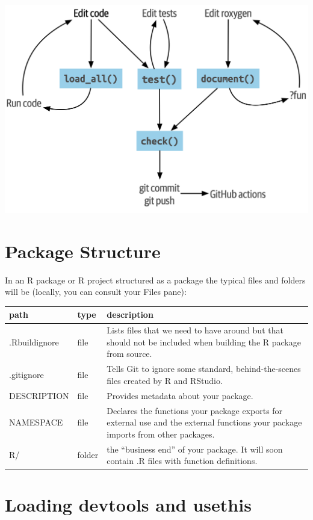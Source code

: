 \documentclass[
]{book}
\begin{document}
\includegraphics[width=19.61in]{images/package_workflow}

\hypertarget{package-structure}{%
\section{Package Structure}\label{package-structure}}

In an R package or R project structured as a package the typical files and folders will be (locally, you can consult your Files pane):

\begin{tabular}{l|l|l}
\hline
path & type & description\\
\hline
.Rbuildignore & file & Lists files that we need to have around but that should not be included when building the R package from source.\\
\hline
.gitignore & file & Tells Git to ignore some standard, behind-the-scenes files created by R and RStudio.\\
\hline
DESCRIPTION & file & Provides metadata about your package.\\
\hline
NAMESPACE & file & Declares the functions your package exports for external use and the external functions your package imports from other packages.\\
\hline
R/ & folder & the “business end” of your package. It will soon contain .R files with function definitions.\\
\hline
\end{tabular}

\hypertarget{loading-devtools-and-usethis}{%
\section{Loading devtools and usethis}\label{loading-devtools-and-usethis}}
\end{document}
